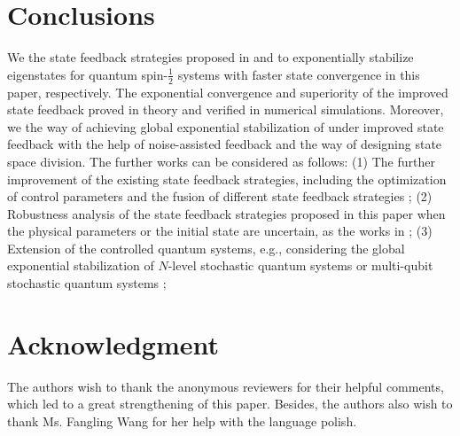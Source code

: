 \documentclass[]{elsarticle}
\begin{document}
\section{Conclusions}\label{Sec:Conclusions}
We {\color{red}{improved}} the state feedback strategies proposed in \cite{LAMC2018} and \cite{WSJZJ2021b} to exponentially stabilize eigenstates for quantum spin-$\frac{1}{2}$ systems with faster state convergence in this paper, respectively. The exponential convergence and superiority of the improved state feedback {\color{red}{were}} proved in theory and verified in numerical simulations. Moreover, we {\color{red}{presented}} the way of achieving global exponential stabilization of {} under {\color{red}{the}} improved state feedback with the help of noise-assisted feedback and the way of designing state space division.
{\color{red}{The all state feedback of exponentially stabilizing eigenstates were also compared and the comparison results were given.}} 
The further works can be considered as follows: (1) The further improvement of the existing state feedback strategies, including the optimization of control parameters and the fusion of different state feedback strategies \cite{WSJZJ2021c}; (2) Robustness analysis of the state feedback strategies proposed in this paper when the physical parameters or the initial state are uncertain, as the works in \cite{LAMOn2020a,LAMOn2020b,EOC2021a,EOC2021b}; (3) Extension of the controlled quantum systems, e.g., considering the global exponential stabilization of $N$-level stochastic quantum systems \cite{LAMJ2019,LDPYJ2019} or multi-qubit stochastic quantum systems \cite{LKCJ2017,LAMC2019,KLLSCJ2021,LDKPYJ2021,LAMJ2021}; {}

\section*{Acknowledgment} %
The authors wish to thank the anonymous reviewers for their helpful comments, which led to a great strengthening of this paper. Besides, the authors also wish to thank Ms. Fangling Wang for her help with the language polish.
\end{document}
